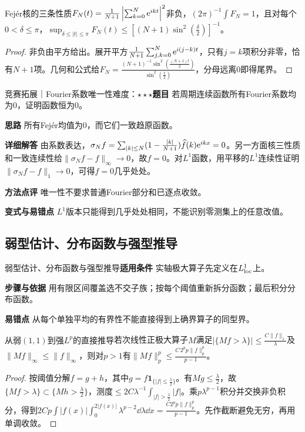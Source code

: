 \begin{theorem}{Fejér核的三条性质}$F_N(t)=\frac1{N+1}\left|\sum_{k=0}^N\mathrm{e}^{ikt}\right|^2$非负，$(2\pi)^{-1}\int F_N=1$，且对每个$0<\delta\le\pi$，$\sup_{\delta\le|t|\le\pi}F_N(t)\le[(N+1)\sin^2(\frac{\delta}{2})]^{-1}$。\end{theorem}\begin{proof}非负由平方给出。展开平方$\frac1{N+1}\sum_{j,k=0}^N\mathrm{e}^{i(j-k)t}$，只有$j=k$项积分非零，恰有$N+1$项。几何和公式给$F_N=\frac{(N+1)^{-1}\sin^2(\frac{(N+1)t}{2})}{\sin^2(\frac{t}{2})}$，分母远离0即得尾界。\end{proof}

\begin{example}{竞赛拓展｜Fourier系数唯一性}{难度：$\star\star\star$}\label{deep:ex:fourier_source_deep:uniqueness}\textbf{题目} 若周期连续函数所有Fourier系数均为0，证明函数恒为0。\par\textbf{思路} 所有Fejér均值为0，而它们一致趋原函数。\par\textbf{详细解答} 由系数表达，$\sigma_Nf=\sum_{|k|\le N}(1-\frac{|k|}{N+1})\widehat f(k)\mathrm{e}^{ikx}=0$。另一方面核三性质和一致连续性给$\|\sigma_Nf-f\|_\infty\to0$，故$f=0$。对$L^1$函数，用平移的$L^1$连续性证明$\|\sigma_Nf-f\|_1\to0$，可得$f=0$几乎处处。\par\textbf{方法点评} 唯一性不要求普通Fourier部分和已逐点收敛。\par\textbf{变式与易错点} $L^1$版本只能得到几乎处处相同，不能识别零测集上的任意改值。\end{example}

\subsection{弱型估计、分布函数与强型推导}\label{deep:fourier_source_deep:maxproof}

\begin{method}{弱型估计、分布函数与强型推导}\textbf{适用条件} 实轴极大算子先定义在$L^1_{\rm loc}$上。\par\textbf{步骤与依据} 用有限区间覆盖选不交子族；按每个阈值重新拆分函数；最后积分分布函数。\par\textbf{易错点} 从每个单独平均的有界性不能直接得到上确界算子的同型界。\end{method}

\begin{theorem}{从弱$(1,1)$到强$L^p$的直接推导}若次线性正极大算子$M$满足$|\{Mf>\lambda\}|\le \frac{C\|f\|_1}{\lambda}$及$\|Mf\|_\infty\le\|f\|_\infty$，则对$p>1$有$\|Mf\|_p^p\le \frac{C\,2^p p\|f\|_p^p}{p-1}$。\end{theorem}\begin{proof}按阈值分解$f=g+h$，其中$g=f\mathbf1_{\{|f|\le\frac{\lambda}{2}\}}$。有$Mg\le\frac{\lambda}{2}$，故$\{Mf>\lambda\}\subset\{Mh>\frac{\lambda}{2}\}$，测度$\le2C\lambda^{-1}\int_{|f|>\frac{\lambda}{2}}|f|$。乘$p\lambda^{p-1}$积分并交换非负积分，得到$2Cp\int|f(x)|\int_0^{2|f(x)|}\lambda^{p-2}\dd\lambda\dd x=\frac{C2^pp\|f\|_p^p}{p-1}$。先作截断避免无穷，再用单调收敛。\end{proof}

